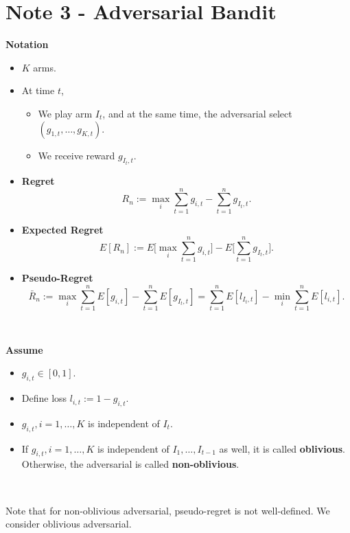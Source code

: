 \newpage
\section{Note 3 - Adversarial Bandit}

\textbf{Notation}
\begin{itemize}
    \item $K$ arms.
    \item At time $t$,
        \begin{itemize}
            \item We play arm $I_t$, and at the same time,
                the adversarial select $(g_{1,t}, \dots, g_{K,t})$.
            \item We receive reward $g_{I_t, t}$.
        \end{itemize}
        \item \textbf{Regret}
        \begin{equation}
            R_n := \max_i \sum_{t=1}^n g_{i,t} - \sum_{t=1}^n g_{I_t, t}.
        \end{equation}
        \item \textbf{Expected Regret}
        \begin{equation}
            E[R_n] := E\bigg[\max_i \sum_{t=1}^n g_{i,t}\bigg] - E\bigg[\sum_{t=1}^n g_{I_t, t}\bigg].
        \end{equation}
        \item \textbf{Pseudo-Regret}
        \begin{equation}
            \bar R_n := \max_i \sum_{t=1}^n E[g_{i,t}] - \sum_{t=1}^n E[g_{I_t, t}]
                = \sum_{t=1}^n E[l_{I_t, t}] - \min_i \sum_{t=1}^n E[l_{i,t}].
        \end{equation}
\end{itemize}
\

\textbf{Assume}
\begin{itemize}
    \item $g_{i,t}\in[0,1]$.
    \item Define loss $l_{i,t}:=1-g_{i,t}$.
    \item $g_{i,t}, i=1,\dots,K$ is independent of $I_t$.
    \item If $g_{i,t}, i=1,\dots,K$ is independent of $I_1, \dots, I_{t-1}$ as well,
        it is called \textbf{oblivious}.
        Otherwise, the adversarial is called \textbf{non-oblivious}.
\end{itemize}
\

Note that for non-oblivious adversarial, pseudo-regret is not well-defined.
We consider oblivious adversarial.

